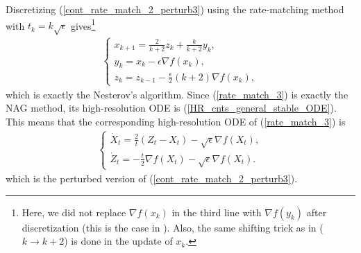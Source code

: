 \documentclass{article}
\theoremstyle{plain}
\theoremstyle{definition}
\theoremstyle{remark}
\begin{document}
Discretizing (\ref{cont_rate_match_2_perturb3}) using the rate-matching method with $t_k=k\sqrt{\epsilon}$ gives\footnote{Here, we did not replace $\nabla f(x_k)$ in the third line with $\nabla f(y_k)$ after discretization (this is the case in \cite{WibisonoE7351}). Also, the same shifting trick as in \cite{WibisonoE7351} ($k\rightarrow k+2$) is done in the update of $x_{k}$.}
\begin{align}\label{rate_match_3}
    \left\{\begin{array}{l}
    x_{k+1}=\frac{2}{k+2}z_k+\frac{k}{k+2}y_k,\\
    y_{k}=x_k-\epsilon\nabla f(x_k),   \\
    z_{k}=z_{k-1} -\frac{\epsilon}{2} (k+2)\nabla f(x_{k})  ,
    \end{array}\right.
\end{align}
which is exactly the Nesterov's algorithm. Since (\ref{rate_match_3}) is exactly the NAG method, its high-resolution ODE is (\ref{HR_cnts_general_stable_ODE}). This means that the corresponding high-resolution ODE of (\ref{rate_match_3}) is 
\begin{align}\label{cont_rate_match_2_perturb4}
    \left\{\begin{array}{l}
         \dot X_t = \frac{2}{t}(Z_t-X_t)-\sqrt{\epsilon}\nabla f(X_t),  \\
          \dot Z_t = -\frac{t}{2}\nabla f(X_t)-\sqrt{\epsilon}\nabla f(X_t).
    \end{array}
    \right.
\end{align}
which is the perturbed version of (\ref{cont_rate_match_2_perturb3}).
\end{document}
